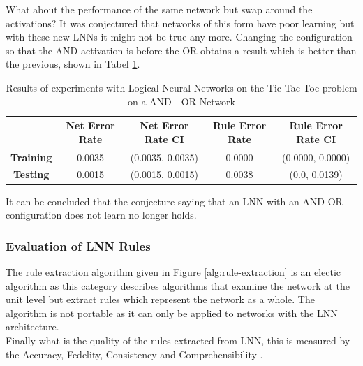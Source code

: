 What about the performance of the same network but swap around the activations? It was conjectured that networks of this form have poor learning \cite{LearningLogicalActivations} but with these new LNNs it might not be true any more. Changing the configuration so that the AND activation is before the OR obtains a result which is better than the previous, shown in Tabel \ref{tab:tic-tac-toe-lnn-peformance-results-and-or}.\\

\begin{table}[H]
	\begin{center}
		\begin{tabular}{| c | c | c | c | c |}
			\hline
			\textbf{} & \textbf{Net Error Rate} & \textbf{Net Error Rate CI} & \textbf{Rule Error Rate} & \textbf{Rule Error Rate CI}\\
			\hline
			\hline
			\textbf{Training} & 0.0035 & (0.0035, 0.0035) & 0.0000 & (0.0000, 0.0000)\\
			\textbf{Testing} & 0.0015 & (0.0015, 0.0015) & 0.0038 & (0.0, 0.0139)\\
			\hline
		\end{tabular}
	\end{center}
	\caption{Results of experiments with Logical Neural Networks on the Tic Tac Toe problem on a AND - OR Network}
	\label{tab:tic-tac-toe-lnn-peformance-results-and-or}
\end{table}

It can be concluded that the conjecture saying that an LNN with an AND-OR configuration does not learn no longer holds.\\



\subsubsection{Evaluation of LNN Rules}
The rule extraction algorithm given in Figure \ref{alg:rule-extraction} is an electic algorithm as this category describes algorithms that examine the network at the unit level but extract rules which represent the network as a whole. The algorithm is not portable as it can only be applied to networks with the LNN architecture.\\

Finally what is the quality of the rules extracted from LNN, this is measured by the Accuracy, Fedelity, Consistency and Comprehensibility \cite{andrews1995survey}.

